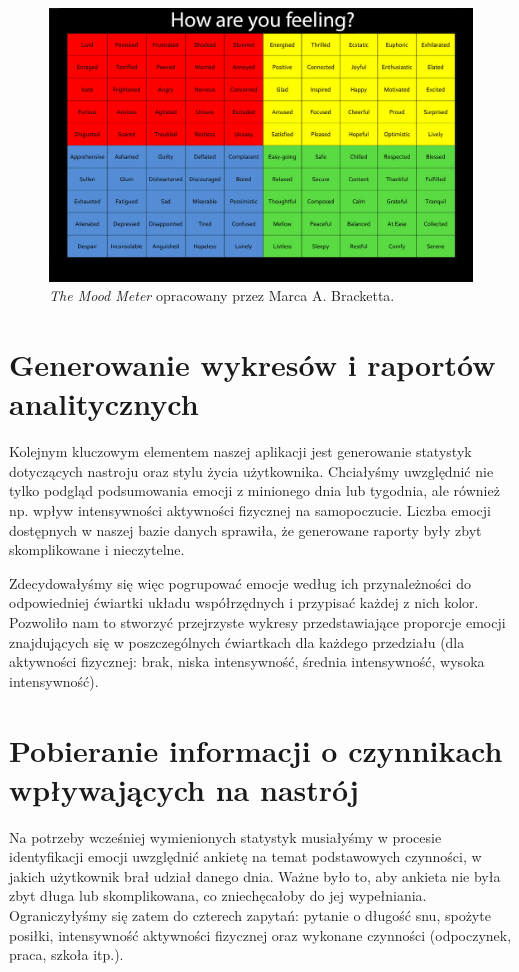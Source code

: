\documentclass[inz, shortabstract]{iithesis}
\begin{document}
\begin{figure}[!hb]
\includegraphics[width=1\textwidth]{mood-meter.jpg} 
\caption{\textit{The Mood Meter} opracowany przez Marca A. Bracketta.\protect\footnotemark}
\end{figure}


\section{Generowanie wykresów i raportów analitycznych}
Kolejnym kluczowym elementem naszej aplikacji jest generowanie statystyk dotyczących nastroju oraz stylu życia użytkownika. Chciałyśmy uwzględnić nie tylko podgląd podsumowania emocji z minionego dnia lub tygodnia, ale również np. wpływ intensywności aktywności fizycznej na samopoczucie. Liczba emocji dostępnych w naszej bazie danych sprawiła, że generowane raporty były zbyt skomplikowane i nieczytelne.

Zdecydowałyśmy się więc pogrupować emocje według ich przynależności do odpowiedniej ćwiartki układu współrzędnych i przypisać każdej z nich kolor. Pozwoliło nam to stworzyć przejrzyste wykresy przedstawiające proporcje emocji znajdujących się w poszczególnych ćwiartkach dla każdego przedziału (dla aktywności fizycznej: brak, niska intensywność, średnia intensywność, wysoka intensywność). 

\section{Pobieranie informacji o czynnikach wpływających na nastrój}
Na potrzeby wcześniej wymienionych statystyk musiałyśmy w procesie identyfikacji emocji uwzględnić ankietę na temat podstawowych czynności, w jakich użytkownik brał udział danego dnia. Ważne było to, aby ankieta nie była zbyt długa lub skomplikowana, co zniechęcałoby do jej wypełniania. Ograniczyłyśmy się zatem do czterech zapytań: pytanie o długość snu, spożyte posiłki, intensywność aktywności fizycznej oraz wykonane czynności (odpoczynek, praca, szkoła itp.). 
\end{document}
